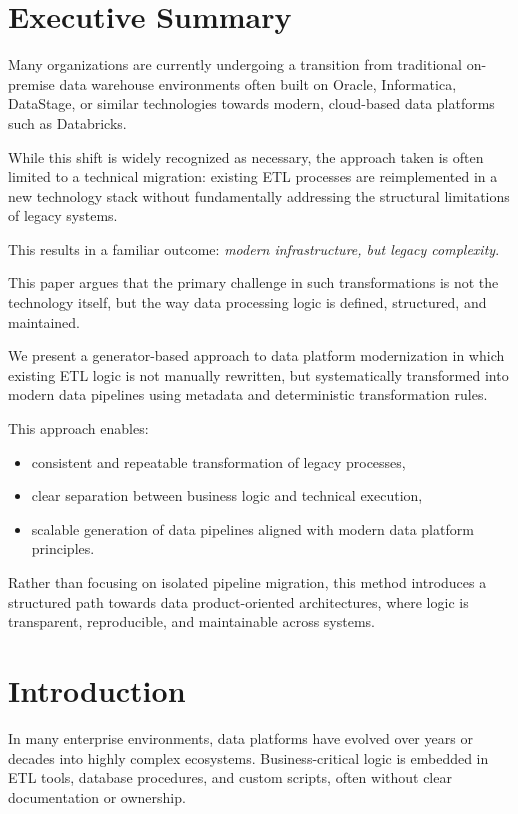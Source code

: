 \documentclass[11pt,a4paper]{article}
\begin{document}
\tableofcontents
\newpage

\section{Executive Summary}

Many organizations are currently undergoing a transition from traditional on-premise data warehouse environments \textendash{} often built on Oracle, Informatica, DataStage, or similar technologies \textendash{} towards modern, cloud-based data platforms such as Databricks.

While this shift is widely recognized as necessary, the approach taken is often limited to a technical migration: existing ETL processes are reimplemented in a new technology stack without fundamentally addressing the structural limitations of legacy systems.

This results in a familiar outcome: \emph{modern infrastructure, but legacy complexity}.

This paper argues that the primary challenge in such transformations is not the technology itself, but the way data processing logic is defined, structured, and maintained.

We present a generator-based approach to data platform modernization in which existing ETL logic is not manually rewritten, but systematically transformed into modern data pipelines using metadata and deterministic transformation rules.

This approach enables:
\begin{itemize}
  \item consistent and repeatable transformation of legacy processes,
  \item clear separation between business logic and technical execution,
  \item scalable generation of data pipelines aligned with modern data platform principles.
\end{itemize}

Rather than focusing on isolated pipeline migration, this method introduces a structured path towards data product-oriented architectures, where logic is transparent, reproducible, and maintainable across systems.

\section{Introduction}

In many enterprise environments, data platforms have evolved over years or decades into highly complex ecosystems. Business-critical logic is embedded in ETL tools, database procedures, and custom scripts, often without clear documentation or ownership.
\end{document}

